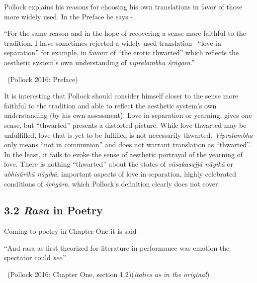 Pollock explains his reasons for choosing his own translations in favor of those more widely used. In the Preface he says -

\begin{myquote}
“For the same reason and in the hope of recovering a sense more faithful to the tradition, I have sometimes rejected a widely used translation –“love in separation” for example, in favour of “the erotic thwarted” which reflects the aesthetic system’s own understanding of \textit{vipralambha śṛṅgāra}.” 

~\hfill (Pollock 2016: Preface)
\end{myquote}

It is interesting that Pollock should consider himself closer to the sense more faithful to the tradition and able to reflect the aesthetic system’s own understanding (by his own assessment). Love in separation or yearning, gives one sense, but “thwarted” presents a distorted picture. While love thwarted may be unfulfilled, love that is yet to be fulfilled is not necessarily thwarted. \textit{Vipralambha} only means “not in communion” and does not warrant translation as “thwarted”. In the least, it fails to evoke the sense of aesthetic portrayal of the yearning of love. There is nothing “thwarted” about the states of \textit{vāsakasajjā nāyikā} or \textit{abhisārikā nāyikā}, important aspects of love in separation, highly celebrated conditions of \textit{śṛṅgāra}, which Pollock’s definition clearly does not cover.


\subsection*{3.2 \textit{Rasa} in Poetry}

Coming to poetry in Chapter One it is said -

\begin{myquote}
“And rasa as first theorized for literature in performance was emotion the spectator could \textit{see}.” 

~\hfill (Pollock 2016: Chapter One, section 1.2)(\textit{italics as in the original})
\end{myquote}

